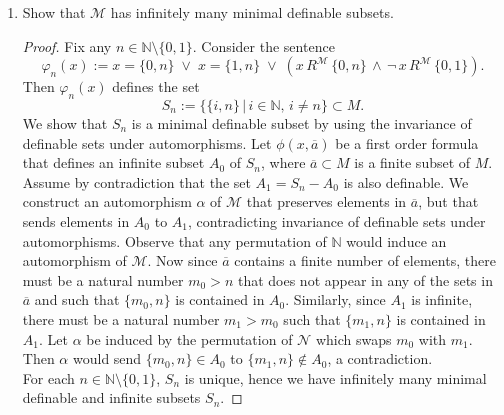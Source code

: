 \documentclass{article}
\begin{document}
\begin{enumerate}
\begin{enumerate}
\begin{enumerate}
          \item Show that $\mathcal{M}$ has infinitely many minimal
            definable subsets.
            \begin{proof}
              Fix any $n\in\mathbb{N}\setminus\{0,1\}$. Consider the
              sentence
              \begin{equation*}
                \varphi_n(x) := x=\{0,n\}\;\vee\; x=\{1,n\}\;\vee\;
                (x\,R^{\mathcal{M}}\, \{0,n\}\,\wedge\,
                \neg\,x\,R^{\mathcal{M}}\,\{0,1\}).
              \end{equation*}
              Then $\varphi_n(x)$ defines the set
              \begin{equation*}
                S_n := \{\{i,n\}\,|\, i\in\mathbb{N},\,i\neq n\}\subset M.
              \end{equation*}
              We show that $S_n$ is a minimal definable subset by using the
              invariance of definable sets under automorphisms. Let
              $\phi(x,\overline{a})$ be a first order formula that defines
              an infinite subset $A_0$ of $S_n$, where $\overline{a}\subset
              M$ is a finite subset of $M$. Assume by contradiction that
              the set $A_1=S_n-A_0$ is also definable. We construct an
              automorphism $\alpha$ of $\mathcal{M}$ that preserves
              elements in $\overline{a}$, but that sends elements in $A_0$ to
              $A_1$, contradicting invariance of definable sets
              under automorphisms. Observe that any permutation of
              $\mathbb{N}$ would induce an automorphism of $\mathcal{M}$.
              Now since $\overline{a}$ contains a finite number of
              elements, there must be a natural number $m_0>n$ that does
              not appear in any of the sets in $\overline{a}$ and such that
              $\{m_0,n\}$ is contained in $A_0$. Similarly, since $A_1$ is
              infinite, there must be a natural number $m_1>m_0$ such that
              $\{m_1,n\}$ is contained in $A_1$. Let $\alpha$ be induced by
              the permutation of $\mathcal{N}$ which swaps $m_0$ with
              $m_1$. Then $\alpha$ would send $\{m_0,n\}\in A_0$ to
              $\{m_1,n\}\not\in A_0$, a contradiction. \\

              For each $n\in\mathbb{N}\setminus\{0,1\}$, $S_n$ is unique,
              hence we have infinitely many minimal definable and infinite
              subsets $S_n$.
            \end{proof}
        \end{enumerate}


\end{enumerate}
\end{enumerate}
\end{document}
